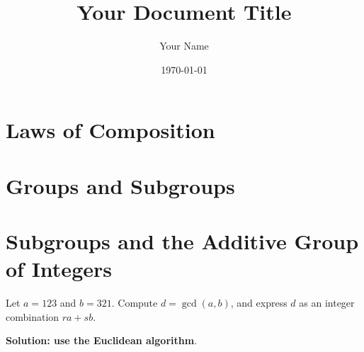 \documentclass{article}
\title{Your Document Title}
\author{Your Name}
\date{\today} %
\begin{document}
\maketitle

\section{Laws of Composition}

\section{Groups and Subgroups}

\section{Subgroups and the Additive Group of Integers}


\begin{problem}
Let $a = 123$ and $b = 321$. Compute $d = \gcd(a, b)$, and express $d$ as an integer combination $ra + sb$.
\end{problem}

\textbf{Solution: use the Euclidean algorithm}.
\\
\end{document}

